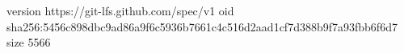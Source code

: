 version https://git-lfs.github.com/spec/v1
oid sha256:5456c898dbc9ad86a9f6c5936b7661c4c516d2aad1cf7d388b9f7a93fbb6f6d7
size 5566
